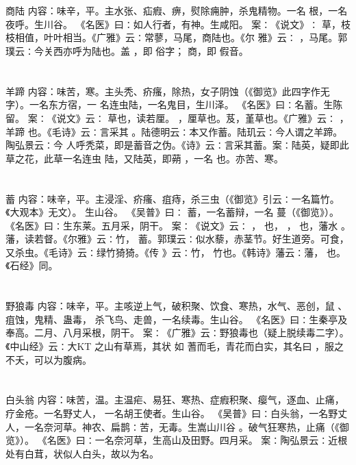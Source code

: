 \documentclass[12pt,UTF8]{ctexbook}
\begin{document}
\chapter{}商陆
内容：味辛，平。主水张、疝瘕、痹，熨除痈肿，杀鬼精物。一名 根，一名夜呼。生川谷。 
《名医》曰∶如人行者，有神。生咸阳。 
案∶《说文》∶ 草，枝枝相值，叶叶相当。《广雅》云∶常蓼，马尾，商陆也。《尔 
雅》云∶ ，马尾。郭璞云∶今关西亦呼为陆也。盖 ，即 俗字； 
商，即 假音。 


\chapter{}羊蹄
内容：味苦，寒。主头秃、疥瘙，除热，女子阴蚀（《御览》此四字作无字）。一名东方宿，一 
名连虫陆，一名鬼目，生川泽。 
《名医》曰∶名蓄。生陈留。 
案∶《说文》云∶ 草也，读若厘。 ，厘草也。芨，堇草也。《广雅》云∶ ，羊蹄 
也。《毛诗》云∶言采其 。陆德明云∶本又作蓄。陆玑云∶今人谓之羊蹄。陶弘景云∶今 
人呼秃菜，即是蓄音之伪。《诗》云∶言采其蓄。案∶陆英，疑即此草之花，此草一名连虫 
陆，又陆英，即蒴 ，一名 也。亦苦、寒。 


\chapter{}蓄
内容：味辛，平。主浸淫、疥瘙、疽痔，杀三虫（《御览》引云∶一名篇竹。《大观本》无文）。 
生山谷。 
《吴普》曰∶ 蓄，一名蓄辩，一名 蔓（《御览》）。 
《名医》曰∶生东莱。五月采，阴干。 
案∶《说文》云∶ ， 也， ， 也，藩水 。藩，读若督。《尔雅》云∶竹， 
蓄。郭璞云∶似水藜，赤茎节。好生道旁。可食，又杀虫。《毛诗》云∶绿竹猗猗。《传 
》云∶竹， 竹也。《韩诗》藩云∶藩， 也。《石经》同。 


\chapter{}野狼毒
内容：味辛，平。主咳逆上气，破积聚、饮食、寒热，水气、恶创，鼠 、疽蚀，鬼精、蛊毒， 
杀飞鸟、走兽，一名续毒。生山谷。 
《名医》曰∶生秦亭及奉高。二月、八月采根，阴干。 
案∶《广雅》云∶野狼毒也（疑上脱续毒二字）。《中山经》云∶大KT 之山有草焉，其状 
如 
蓍而毛，青花而白实，其名曰 ，服之不夭，可以为腹病。 


\chapter{}白头翁
内容：味苦，温。主温疟、易狂、寒热、症瘕积聚、瘿气，逐血、止痛，疗金疮。一名野丈人， 
一名胡王使者。生山谷。 
《吴普》曰∶白头翁，一名野丈人，一名奈河草。神农、扁鹊∶苦，无毒。生嵩山川谷 
。破气狂寒热，止痛（《御览》）。 
《名医》曰∶一名奈河草，生高山及田野。四月采。 
案∶陶弘景云∶近根处有白茸，状似人白头，故以为名。 
\end{document}
